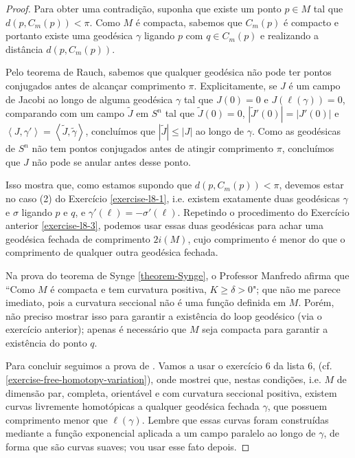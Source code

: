 \documentclass{book}
\begin{document}
\begin{proof}
Para obter uma contradição, suponha que
existe um ponto $p \in M$ tal que
 $d(p, C_m(p))<\pi$. Como $M$ é compacta,
 sabemos que $C_m(p)$ é compacto e
portanto existe uma geodésica $\gamma$
ligando $p$ com $q \in C_m(p)$ e
realizando a distância $d(p,C_m(p))$.

Pelo teorema de Rauch, sabemos que qualquer
geodésica não pode ter pontos
conjugados antes de alcançar comprimento
$\pi$. Explicitamente, se $J$ é um
campo de Jacobi ao longo de alguma geodésica
$\gamma$ tal que $J(0)=0$ e
$J(\ell(\gamma))=0$, comparando com um campo
$\tilde{J}$ em $S^n$ tal que
 $\tilde{J}(0)=0$, $|\tilde{J}'(0)|=|J'(0)|$
 e
$\left\langle{}J,\gamma'\right\rangle{}=\left\langle{}\tilde{J},
\tilde{\gamma}\right\rangle{}$,
concluímos que
 $|\tilde{J}|\leq |J|$ ao longo de $\gamma$.
 Como as geodésicas de $S^n$ não
 tem pontos conjugados antes de atingir
 comprimento $\pi$, concluímos que
$J$ não pode se anular antes desse ponto.

Isso mostra que, como estamos supondo que
$d(p,C_m(p))<\pi$, devemos estar no
caso (2) do Exercício \ref{exercise-l8-1},
i.e. existem exatamente duas
geodésicas $\gamma$ e $\sigma$ ligando $p$ e
$q$, e
$\gamma'(\ell)=-\sigma'(\ell)$. Repetindo o
procedimento do Exercício anterior
 \ref{exercise-l8-3}, podemos usar essas duas
 geodésicas para achar uma
geodésica fechada de comprimento $2i(M)$,
cujo comprimento é menor do que o
comprimento de qualquer outra geodésica
fechada.

\begin{remark}
\label{remark-curva-posit-impli-maior-que}
Na prova do teorema de Synge
\ref{theorem-Synge}, o Professor
Manfredo afirma que ``Como $M$ é compacta e
tem curvatura positiva, $K\geq
\delta>0$"; que não me parece imediato, pois
a curvatura seccional não é uma
função definida em $M$. Porém, não preciso
mostrar isso para garantir a
existência do loop geodésico (via o exercício
anterior); apenas é necessário
que $M$ seja compacta para garantir a
existência do ponto $q$.
\end{remark}

\medskip

Para concluir seguimos a prova de \cite{doc}.
Vamos a usar o exercício 6 da
lista 6, (cf.
\ref{exercise-free-homotopy-variation}), onde
mostrei que, nestas condições, i.e.
$M$ de dimensão par, completa, orientável e
com curvatura seccional positiva,
existem curvas livremente homotópicas a
qualquer geodésica fechada $\gamma$, que
possuem comprimento menor que $\ell(\gamma)$.
Lembre que essas curvas foram
construídas mediante a função exponencial
aplicada a um campo paralelo ao longo
de $\gamma$, de forma que são curvas suaves;
vou usar esse fato depois.


\end{proof}
\end{document}

